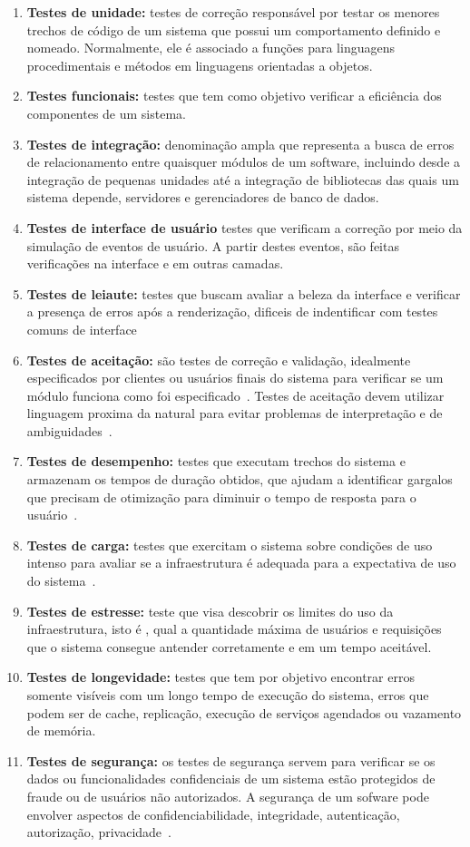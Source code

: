 \begin{enumerate}

\item \textbf{Testes de unidade:} testes de correção responsável por testar os 
menores trechos de código de um sistema que possui um comportamento definido e 
nomeado.
%
Normalmente, ele é associado a funções para linguagens procedimentais e métodos em 
linguagens orientadas a objetos.
\item \textbf{Testes funcionais:} testes que tem como objetivo verificar a eficiência
dos componentes de um sistema.~
\item \textbf{Testes de integração:} denominação ampla que representa a busca de 
erros de relacionamento entre quaisquer módulos de um software, incluindo desde 
a integração de pequenas unidades até a integração de bibliotecas das quais um 
sistema depende, servidores e gerenciadores de banco de dados.
\item \textbf{Testes de interface de usuário} testes que verificam a correção 
por meio da simulação de eventos de usuário. A partir destes eventos, são feitas 
verificações na interface e em outras camadas.
\item \textbf{Testes de leiaute:} testes que buscam avaliar a beleza da interface 
e verificar a presença de erros após a renderização, dificeis de indentificar 
com testes comuns de interface
\item \textbf{Testes de aceitação:} são testes de correção e validação, idealmente 
especificados por clientes ou usuários finais do sistema para verificar se um 
módulo funciona como foi especificado~.
%
Testes de aceitação devem utilizar linguagem proxima da natural para evitar 
problemas de interpretação e de ambiguidades~.
\item \textbf{Testes de desempenho:} testes que executam trechos do sistema e 
armazenam os tempos de duração obtidos, que ajudam a identificar gargalos que 
precisam de otimização para diminuir o tempo de resposta  para o usuário~.
\item \textbf{Testes de carga:}  testes que exercitam o sistema sobre condições de uso 
intenso para avaliar se a infraestrutura é adequada para a expectativa de uso do 
sistema~.
\item \textbf{Testes de estresse:} teste que visa descobrir os limites do uso da 
infraestrutura, isto é , qual a quantidade máxima de usuários e requisições que o 
sistema consegue antender corretamente e em um tempo aceitável.
\item \textbf{Testes de longevidade:} testes que tem por objetivo encontrar erros 
somente visíveis com um longo tempo de execução do sistema, erros que podem ser de cache, replicação, 
execução de serviços agendados ou vazamento de memória.
\item \textbf{Testes de segurança:} os testes de segurança servem para verificar se 
os dados ou funcionalidades confidenciais de um sistema  estão protegidos de fraude 
ou de usuários não autorizados. A segurança de um sofware pode envolver aspectos de 
confidenciabilidade, integridade, autenticação, autorização, privacidade~.


\end{enumerate}
